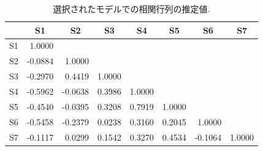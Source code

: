 \documentclass[11pt,dvipdfmx]{jarticle}
\theoremstyle{definition}
\begin{document}
\begin{table}[htbp]
\caption{選択されたモデルでの相関行列の推定値. }
\label{table:cor-final}
\begin{center}{\small
    \begin{tabular}{|c|rrrrrrr|}
        \hline
        & \multicolumn{1}{c}{S1} & \multicolumn{1}{c}{S2} & \multicolumn{1}{c}{S3} & \multicolumn{1}{c}{S4} & \multicolumn{1}{c}{S5} & \multicolumn{1}{c}{S6} & \multicolumn{1}{c|}{S7} \\ \hline
        S1 & 1.0000                 &                        &                        &                        &                        &                        &                         \\
        S2 & -0.0884                & 1.0000                 &                        &                        &                        &                        &                         \\
        S3 & -0.2970                & 0.4419                 & 1.0000                 &                        &                        &                        &                         \\
        S4 & -0.5962                & -0.0638                & 0.3986                 & 1.0000                 &                        &                        &                         \\
        S5 & -0.4540                & -0.0395                & 0.3208                 & 0.7919                 & 1.0000                 &                        &                         \\
        S6 & -0.5458                & -0.2379                & 0.0238                 & 0.3160                 & 0.2045                 & 1.0000                 &                         \\
        S7 & -0.1117                & 0.0299                 & 0.1542                 & 0.3270                 & 0.4534                 & -0.1064                & 1.0000                  \\ \hline
    \end{tabular}}
\end{center}
\end{table}
\end{document}
